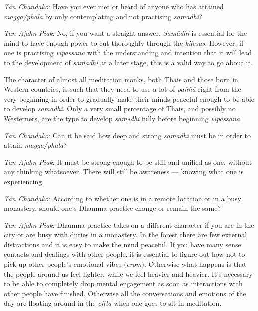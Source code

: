 \emph{Tan Chandako}: Have you ever met or heard of anyone who has
attained \emph{magga/phala} by only contemplating and not practising
\emph{samādhi}?

\emph{Tan Ajahn Piak}: No, if you want a straight answer. \emph{Samādhi}
is essential for the mind to have enough power to cut thoroughly through
the \emph{kilesas}. However, if one is practising \emph{vipassanā} with
the understanding and intention that it will lead to the development of
\emph{samādhi} at a later stage, this is a valid way to go about it.

The character of almost all meditation monks, both Thais and those born
in Western countries, is such that they need to use a lot of
\emph{paññā} right from the very beginning in order to gradually make
their minds peaceful enough to be able to develop \emph{samādhi}. Only a
very small percentage of Thais, and possibly no Westerners, are the type
to develop \emph{samādhi} fully before beginning \emph{vipassanā}.

\emph{Tan Chandako}: Can it be said how deep and strong \emph{samādhi}
must be in order to attain \emph{magga/phala}?

\emph{Tan Ajahn Piak}: It must be strong enough to be still and unified
as one, without any thinking whatsoever. There will still be awareness
--- knowing what one is experiencing.

\emph{Tan Chandako}: According to whether one is in a remote location or
in a busy monastery, should one's Dhamma practice change or remain the
same?

\emph{Tan Ajahn Piak}: Dhamma practice takes on a different character if
you are in the city or are busy with duties in a monastery. In the
forest there are few external distractions and it is easy to make the
mind peaceful. If you have many sense contacts and dealings with other
people, it is essential to figure out how not to pick up other people's
emotional vibes (\emph{arom}). Otherwise what happens is that the people
around us feel lighter, while we feel heavier and heavier. It's
necessary to be able to completely drop mental engagement as soon as
interactions with other people have finished. Otherwise all the
conversations and emotions of the day are floating around in the
\emph{citta} when one goes to sit in meditation.

